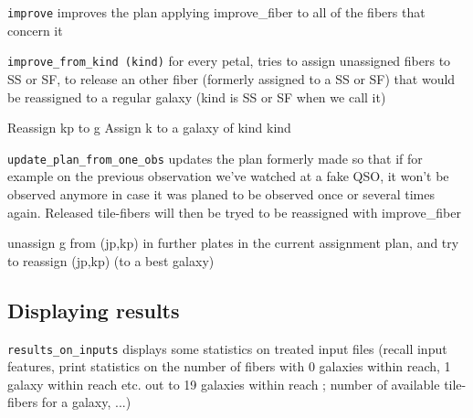 \documentclass{article}
\begin{document}
{\tt improve} improves the plan applying improve\_fiber to all of the fibers that concern it

{\tt improve\_from\_kind (kind)} for every petal, tries to assign unassigned fibers to SS or SF, to release an other fiber (formerly assigned to a SS or SF) that would be reassigned to a regular galaxy (kind is SS or SF when we call it)

\begin{algorithm}
	\caption{improve\_from\_kind (kind,j0,n)}\label{euclid}
	\begin{algorithmic}[1]
		\State Reassign kp to g
		\State Assign k to a galaxy of kind kind
		\EndIf
		\EndFor
		\EndFor
		\EndFor
		\EndFor
		\EndFor
	\end{algorithmic}
\end{algorithm}

{\tt update\_plan\_from\_one\_obs} updates the plan formerly made so that if for example on the previous observation we've watched at a fake QSO, it won't be observed anymore in case it was planed to be observed once or several times again. Released tile-fibers will then be tryed to be reassigned with improve\_fiber

\begin{algorithm}
	\caption{Update\_plan\_from\_one\_observation(j)}\label{euclid}
	\begin{algorithmic}[1]
		\State unassign g from (jp,kp) in further plates in the current assignment plan, and try to reassign (jp,kp) (to a best galaxy)
		\EndIf
		\EndFor
	\end{algorithmic}
\end{algorithm}


\subsection{Displaying results}
{\tt results\_on\_inputs} displays some statistics on treated input files (recall input features, print statistics on the number of fibers with 0 galaxies within reach, 1 galaxy within reach etc. out to 19 galaxies within reach ; number of available tile-fibers for a galaxy, ...)
\end{document}
